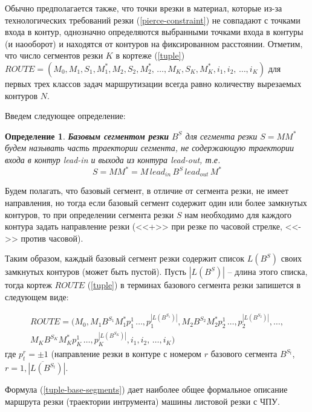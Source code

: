 \documentclass[11pt,twoside,openany]{report}
\newcounter{theo}
\newcounter{pred}
\newcounter{opred}
\newtheorem{opred}{Определение}[section]
\begin{document}
Обычно предполагается также,
что точки врезки в материал,
которые из-за технологических требований резки
(\ref{pierce-constraint})
не совпадают с точками входа в контур,
однозначно определяются выбранными точками входа в контуры (и наооборот)
и находятся от контуров на фиксированном расстоянии.
Отметим, что число сегментов резки
$K$ в кортеже (\ref{tuple})
$ROUTE = (
  M_0, M_1, S_1, M_1^*, M_2, S_2, M_2^*, \,\dots, M_K, S_K, M_K^*,
  i_1, i_2, \,\dots, i_K
)$
для первых трех классов задач маршрутизации всегда равно количеству вырезаемых контуров
$N$.

Введем следующее определение:

\begin{opred}
  \label{def:base-segment}
  {\bf Базовым сегментом резки}
  $B^S$
  для сегмента резки
  $S=MM^*$
  будем называть часть траектории сегмента,
  не содержающую траектории входа в контур
  {\it lead-in} и выхода из контура {\it lead-out},
  т.е.
  \begin{equation}
    S=MM^* = M \, lead_{in} \, B^S \, lead_{out} \, M^*
    \label{base-segment}
  \end{equation}
\end{opred}

Будем полагать,
что базовый сегмент,
в отличие от сегмента резки,
не имеет направления,
но тогда если базовый сегмент содержит
один или более замкнутых контуров,
то при определении сегмента резки $S$
нам необходимо для каждого контура задать направление резки
(<<+>> при резке по часовой стрелке,
<<->> против часовой).

Таким образом,
каждый базовый сегмент резки
содержит список
$L(B^S)$
своих замкнутых контуров (может быть пустой).
Пусть
$|L(B^S)|$ --
длина этого списка, тогда кортеж $ROUTE$ (\ref{tuple})
в терминах базового сегмента резки запишется в следующем виде:

\begin{multline}
  ROUTE = (
    M_0, M_1 B^{S_1} M_1^* p_1^1 \,\dots, p_1^{|L(B^{S_1})|},
    M_2 B^{S_2} M_2^* p_2^1 \,\dots, p_2^{|L(B^{S_2})|},
    \dots, \\
    M_K B^{S_K} M_K^* p_K^1 \,\dots, p_K^{|L(B^{S_K})|},
    i_1, i_2, \,\dots, i_K
  )
  \label{tuple-base-segments}
\end{multline}
где $p_t^r=\pm 1$
(направление резки в контуре с номером $r$ базового сегмента  $B^{S_t}$,
$r=\overline{1, |L(B^{S_t})|}$.

Формула (\ref{tuple-base-segments})
дает наиболее общее формальное описание маршрута резки (траектории интрумента)
машины листовой резки с ЧПУ.
\end{document}
